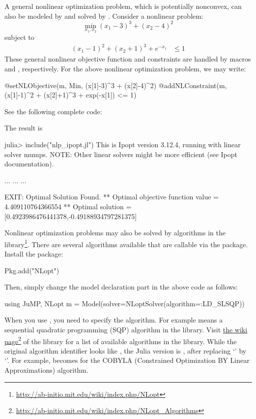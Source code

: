 A general nonlinear optimization problem, which is potentially nonconvex, can also be modeled by \jump{} and solved by . Consider a nonlinear problem:
\begin{equation*}
    \min_{x_1, x_2} (x_1-3)^3 + (x_2-4)^2
\end{equation*}
subject to
\begin{align*}
    (x_1-1)^2+(x_2+1)^3+e^{-x_1} &\leq 1
\end{align*}
These general nonlinear objective function and constraints are handled by macros  and , respectively. For the above nonlinear optimization problem, we may write:
\begin{code}
@setNLObjective(m, Min, (x[1]-3)^3 + (x[2]-4)^2)
@addNLConstraint(m, (x[1]-1)^2 + (x[2]+1)^3 + exp(-x[1]) <= 1)
\end{code}
\noindent See the following complete code:
\begin{codelisting}
\end{codelisting}
\noindent The result is
\begin{code}
julia> include("nlp_ipopt.jl")
This is Ipopt version 3.12.4, running with linear solver mumps.
NOTE: Other linear solvers might be more efficient (see Ipopt documentation).

...
...
...

EXIT: Optimal Solution Found.
** Optimal objective function value = 4.409110764366554
** Optimal solution = [0.4923986476441378,-0.49188934797281375]
\end{code}


Nonlinear optimization problems may also be solved by algorithms in the  library\footnote{\url{http://ab-initio.mit.edu/wiki/index.php/NLopt}}. There are several algorithms available that are callable via the  package. Install the package:
\begin{code}
Pkg.add("NLopt")
\end{code}
\noindent Then, simply change the model declaration part in the above code as follows:
\begin{code}
using JuMP, NLopt
m = Model(solver=NLoptSolver(algorithm=:LD_SLSQP))
\end{code}
\noindent When you use , you need to specify the algorithm. For example  means a sequential quadratic programming (SQP) algorithm in the library. Visit \href{http://ab-initio.mit.edu/wiki/index.php/NLopt_Algorithms}{the wiki page}\footnote{\url{http://ab-initio.mit.edu/wiki/index.php/NLopt_Algorithms}} of the library for a list of available algorithms in the  library. While the original algorithm identifier looks like , the Julia version is , after replacing `' by `\kode{:}'. For example,  becomes  for the COBYLA (Constrained Optimization BY Linear Approximations) algorithm.


